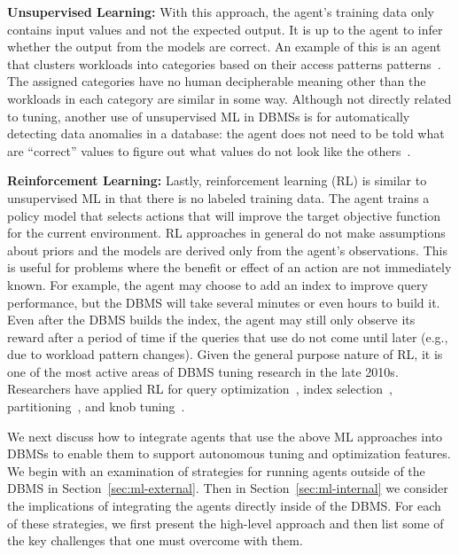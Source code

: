 \documentclass[11pt,times]{article}
\begin{document}
\textbf{Unsupervised Learning:}
With this approach, the agent's training data only contains input values and not the expected 
output. It is up to the agent to infer whether the output from the models are correct. An example 
of this is an agent that clusters workloads into categories based on their access patterns
patterns~\cite{mozafari13,gupta08}. The assigned categories have no human decipherable meaning other 
than the workloads in each category are similar in some way. Although not directly related to 
tuning, another use of unsupervised ML in DBMSs is for automatically detecting data anomalies in a 
database: the agent does not need to be told what are ``correct'' values to figure out what 
values do not look like the others~\cite{bailis17}. 
\\ \vspace{-0.1in}

\textbf{Reinforcement Learning:}
Lastly, reinforcement learning (RL) is similar to unsupervised ML in that there is no labeled 
training data. The agent trains a policy model that selects actions that will improve the target 
objective function for the current environment. RL approaches in general do not make assumptions 
about priors and the models are derived only from the agent's observations. This is useful for 
problems where the benefit or effect of an action are not immediately known. For example, the agent 
may choose to add an index to improve query performance, but the DBMS will take several 
minutes or even hours to build it.
Even after the DBMS builds the index, the agent may still only observe its reward after a 
period of time if the queries that use do not come until later (e.g., due to workload pattern 
changes).
Given the general purpose nature of RL, it is one of the most active areas of DBMS tuning research 
in the late 2010s. Researchers have applied RL for query 
optimization~\cite{marcus18,ortiz18,marcus19-opt}, index 
selection~\cite{basu15,sharma18,zhang19-ai},
partitioning~\cite{durand18,hilprecht19}, and knob tuning~\cite{zhang19-cdbtune}.
\\ \vspace{-0.1in}

We next discuss how to integrate agents that use the above ML approaches into DBMSs 
to enable them to support autonomous tuning and optimization features. We begin with an examination 
of strategies for running agents outside of the DBMS in Section~\ref{sec:ml-external}. Then in 
Section~\ref{sec:ml-internal} we consider the implications of integrating the agents directly inside 
of the DBMS. For each of these strategies, we first present the high-level approach and then list 
some of the key challenges that one must overcome with them.
\end{document}
